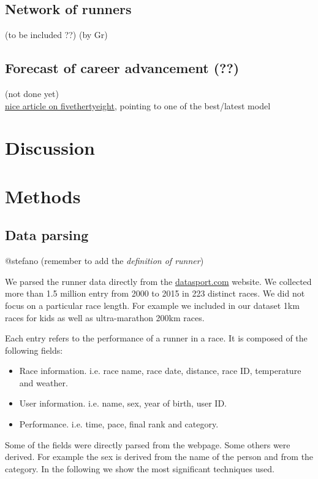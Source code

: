 \documentclass[fleqn,10pt]{wlscirep}
\begin{document}
		\subsection*{Network of runners}
	
				(to be included ??)
				(by Gr)
		
		\subsection*{Forecast of career advancement (??)}
	
				(not done yet)		\\
				\href{https://fivethirtyeight.com/features/tell-us-two-things-and-well-tell-you-how-fast-youd-run-a-marathon/}{nice article on fivethertyeight},
				pointing to one of the best/latest model \cite{vickers2016empirical}

	

\section*{Discussion}


\section*{Methods}


	\subsection*{Data parsing}
	
		@stefano 
		(remember to add the \textit{definition of runner})
	
        We parsed the runner data directly from the \url{datasport.com} website. 
        We collected more than 1.5 million entry from 2000 to 2015 in 223 distinct races.
        We did not focus on a particular race length. For example we included in our dataset 
        1km races for kids as well as ultra-marathon 200km races.

        Each entry refers to the performance of a runner in a race. It is composed of the following 
        fields:
        \begin{itemize}
            \item Race information. i.e. race name, race date, distance, race ID, temperature and weather.
            \item User information. i.e. name, sex, year of birth, user ID.
            \item Performance. i.e. time, pace, final rank and category.
        \end{itemize}
        Some of the fields were directly parsed from the webpage. Some others were derived. For
        example the sex is derived from the name of the person and from the category.
        In the following we show the most significant techniques used.
\end{document}
